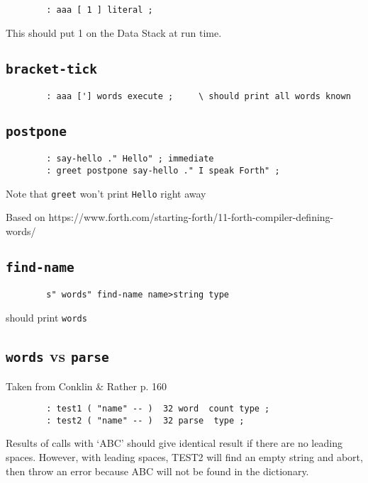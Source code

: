 \begin{lstlisting}
        : aaa [ 1 ] literal ;
\end{lstlisting}

This should put 1 on the Data Stack at run time.


\subsection{\texttt{bracket-tick}}

\begin{lstlisting}
        : aaa ['] words execute ;     \ should print all words known
\end{lstlisting}


\subsection{\texttt{postpone}}

\begin{lstlisting}
        : say-hello ." Hello" ; immediate
        : greet postpone say-hello ." I speak Forth" ;
\end{lstlisting}

Note that \texttt{greet} won't print \texttt{Hello} right away

Based on https://www.forth.com/starting-forth/11-forth-compiler-defining-words/


\subsection{\texttt{find-name}}

\begin{lstlisting}
        s" words" find-name name>string type
\end{lstlisting}

should print \texttt{words}


\subsection{\texttt{words} vs \texttt{parse}}

Taken from Conklin \& Rather p. 160

\begin{lstlisting}
        : test1 ( "name" -- )  32 word  count type ; 
        : test2 ( "name" -- )  32 parse  type ; 
\end{lstlisting}

Results of calls with `ABC' should give identical result if there are no
leading spaces. However, with leading spaces, TEST2 will find an empty string
and abort, then throw an error because ABC will not be found in the dictionary.

